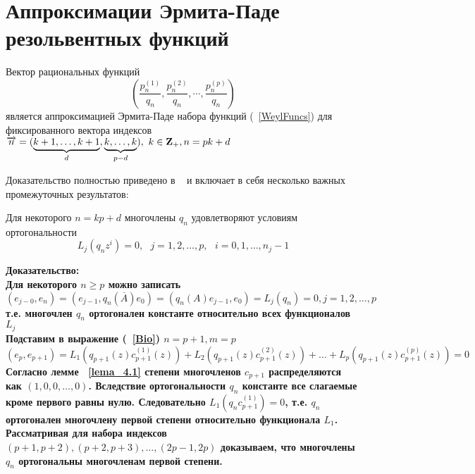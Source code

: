 \section{Аппроксимации Эрмита-Паде резольвентных функций}
\begin{teor}
Вектор рациональных функций
$$%
\left( \frac {p^{(1)}_n} {q_n}, \frac {p^{(2)}_n} {q_n}, \cdots,
\frac {p^{(p)}_n} {q_n} \right)
$$%
является
аппроксимацией Эрмита-Паде набора функций (~\ref{WeylFuncs}) для
фиксированного вектора индексов $\overrightarrow{n}=
(\underbrace{k+1,\ldots,k+1}_{d},\underbrace{k,\ldots,k}_{p-d}),\mbox{
} k\in{\bf Z \rm}_{+},n=pk+d$ \end{teor} Доказательство полностью
приведено в ~\cite{KaliaguineAA} и включает в себя несколько
важных промежуточных результатов: \\
\begin{lema}
\label{lema_4.2} Для некоторого $n=kp+d$ многочлены $q_n$
удовлетворяют условиям ортогональности
$$%
L_j(q_nz^i)=0,\mbox{   }j=1,2,\ldots,p,\mbox{ }i=0,1,\ldots,n_j-1
$$%
\end{lema}
\bf Доказательство: \rm \\
Для некоторого $n \geq p$ можно записать
$$%
(e_{j-0},e_n)=(e_{j-1},q_n(\overline{A})e_0)=(q_n(A)e_{j-1},e_0)=L_j(q_n)=0,j=1,2,\ldots,p
$$%
т.е. многочлен $q_n$ ортогонален константе
относительно всех
функционалов $L_j$ \\
Подставим в выражение (~\ref{Bio}) $n=p+1,m=p$
$$%
(e_p,e_{p+1})
=L_1(q_{p+1}(z)c_{p+1}^{(1)}(z))+L_2(q_{p+1}(z)c_{p+1}^{(2)}(z))+\ldots+L_p(q_{p+1}(z)c_{p+1}^{(p)}(z))=0
$$%
Согласно лемме ~\ref{lema_4.1} степени
многочленов $c_{p+1}$ распределяются как $(1,0,0,\ldots,0)$.
Вследствие ортогональности $q_n$ константе все слагаемые кроме
первого равны нулю. Следовательно $L_1(q_{n}c_{p+1}^{(1)}) = 0$,
т.е. $q_{n}$ ортогонален
многочлену первой степени относительно функционала $L_1$. \\
Рассматривая  для набора индексов
$(p+1,p+2),(p+2,p+3),\ldots,(2p-1,2p)$ доказываем, что многочлены
$q_n$ ортогональны многочленам первой степени. \\
